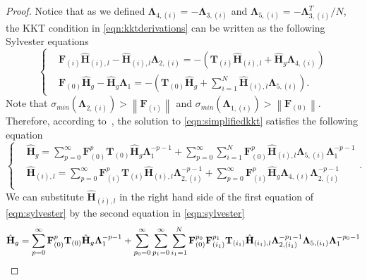 \documentclass[twoside,11pt]{article}
\newcommand{\norm}[1]{\left\lVert#1\right\rVert}
\newcommand{\matF}{\mathbf{F}}
\newcommand{\hmatH}{{\hat{\mathbf{H}}}{}}
\newcommand{\matT}{\mathbf{T}}
\newcommand{\matLambda}{\mathbf{\Lambda}}
\newcommand{\veci}{\mathbf{i}}
\newcommand{\vecp}{\mathbf{p}}
\begin{document}
\begin{proof}
Notice that as we defined $\matLambda_{4,(i)}=-\matLambda_{3,(i)}$ and $\matLambda_{5,(i)}=-\matLambda_{3,(i)}^T/N$, the KKT condition in \eqref{eqn:kktderivations} can be written as the following Sylvester equations
\begin{equation}
\label{eqn:simplifiedkkt}
\left\{
\begin{aligned}
&\matF_{(i)}\hmatH_{(i),l}-\hmatH_{(i),l}\matLambda_{2,(i)} = -\left(\matT_{(i)} \hmatH_{(i),l}+\hmatH_g\matLambda_{4,(i)}\right)\\
&\matF_{(0)}\hmatH_{g}-\hmatH_{g}\matLambda_{1} = -\left(\matT_{(0)} \hmatH_{g}+\sum_{i=1}^N\hmatH_{(i),l}\matLambda_{5,(i)}\right).
\end{aligned}\right.
\end{equation}
 Note that $\sigma_{min}(\matLambda_{2,(i)})>\norm{\matF_{(i)}}$ and $\sigma_{min}(\matLambda_{1,(i)})>\norm{\matF_{(0)}}$. Therefore, according to~\citet[Theorem VII.2.2]{matrixanalysis},  the solution to \eqref{eqn:simplifiedkkt} satisfies the following equation
\begin{equation}
\label{eqn:sylvester}
\left\{
\begin{aligned}
&\hmatH_{g}=\sum_{p=0}^{\infty}\matF_{(0)}^p\matT_{(0)}\hmatH_{g}\matLambda_{1}^{-p-1}+\sum_{p=0}^{\infty}\sum_{i=1}^N\matF_{(0)}^p\hmatH_{(i),l}\matLambda_{5,(i)}\matLambda_{1}^{-p-1}\\
&\hmatH_{(i),l}=\sum_{p=0}^{\infty}\matF_{(i)}^p\matT_{(i)}\hmatH_{(i),l}\matLambda_{2,(i)}^{-p-1}+\sum_{p=0}^{\infty}\matF_{(i)}^p\hmatH_{g}\matLambda_{4,(i)}\matLambda_{2,(i)}^{-p-1}\\
\end{aligned}\right. .
\end{equation}
We can substitute $\hmatH_{(i),l}$ in the right hand side of the first equation of \eqref{eqn:sylvester} by the second equation in \eqref{eqn:sylvester}
\begin{align}
&\hmatH_{g}=\sum_{p=0}^{\infty}\matF_{(0)}^p\matT_{(0)}\hmatH_{g}\matLambda_{1}^{-p-1}+\sum_{p_0=0}^{\infty}\sum_{p_1=0}^{\infty}\sum_{i_1=1}^N\matF_{(0)}^{p_0}\matF_{(i_1)}^{p_1}\matT_{(i_1)}\hmatH_{(i_1),l}\matLambda_{2,(i_1)}^{-p_1-1}\matLambda_{5,(i_1)}\matLambda_{1}^{-p_0-1}\notag\\

\end{align}
\end{proof}
\end{document}
